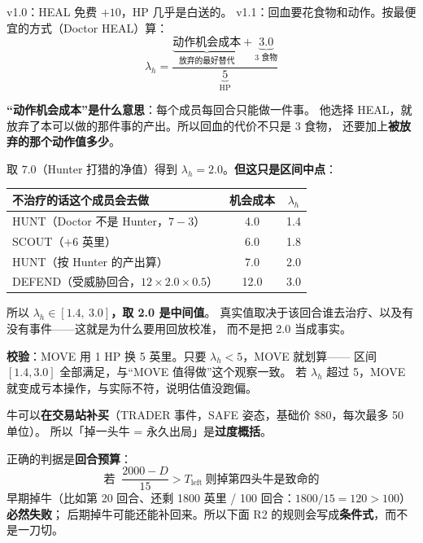 \documentclass[UTF8,11pt,a4paper]{ctexart}
\begin{document}
\begin{warnbox}[title={$\lambda_h$ 为什么是 2.0（v1.0 文档这里是 0.8）}]
v1.0：HEAL 免费 $+10$，HP 几乎是白送的。
v1.1：回血要花食物和动作。按最便宜的方式（Doctor HEAL）算：
\[
\lambda_h=\frac{\underbrace{\text{动作机会成本}}_{\text{放弃的最好替代}}+\underbrace{3.0}_{\text{3 食物}}}{\underbrace{5}_{\text{HP}}}
\]

\noindent\textbf{“动作机会成本”是什么意思}：每个成员每回合只能做一件事。
他选择 HEAL，就放弃了本可以做的那件事的产出。所以回血的代价不只是 3 食物，
还要加上\textbf{被放弃的那个动作值多少}。

\smallskip
\noindent 取 $7.0$（Hunter 打猎的净值）得到 $\lambda_h=2.0$。\textbf{但这只是区间中点}：

\begin{center}
\small
\begin{tabular}{@{}p{6.4cm}cc@{}}
\toprule
\textbf{不治疗的话这个成员会去做} & \textbf{机会成本} & $\lambda_h$ \\
\midrule
HUNT（Doctor 不是 Hunter，$7-3$） & 4.0 & 1.4 \\
SCOUT（$+6$ 英里） & 6.0 & 1.8 \\
HUNT（按 Hunter 的产出算） & 7.0 & 2.0 \\
DEFEND（受威胁回合，$12\times2.0\times0.5$） & 12.0 & 3.0 \\
\bottomrule
\end{tabular}
\end{center}

\noindent 所以 \textbf{$\lambda_h\in[1.4,\ 3.0]$，取 2.0 是中间值}。
真实值取决于该回合谁去治疗、以及有没有事件——这就是为什么要用回放校准，
而不是把 2.0 当成事实。

\smallskip
\noindent\textbf{校验}：MOVE 用 1 HP 换 5 英里。只要 $\lambda_h<5$，MOVE 就划算——
区间 $[1.4,3.0]$ 全部满足，与“MOVE 值得做”这个观察一致。
若 $\lambda_h$ 超过 5，MOVE 就变成亏本操作，与实际不符，说明估值没跑偏。
\end{warnbox}

\begin{warnbox}[title={$\lambda_o$ 不是永久损失——这里 v1.0 的说法要修正}]
牛可以\textbf{在交易站补买}（TRADER 事件，SAFE 姿态，基础价 \$80，每次最多 50 单位）。
所以「掉一头牛 = 永久出局」是\textbf{过度概括}。

正确的判据是\textbf{回合预算}：
\[
\text{若 }\ \frac{2000-D}{15}>T_{\text{left}}\ \text{则掉第四头牛是致命的}
\]
早期掉牛（比如第 20 回合、还剩 1800 英里 / 100 回合：$1800/15=120>100$）\textbf{必然失败}；
后期掉牛可能还能补回来。所以下面 R2 的规则会写成\textbf{条件式}，而不是一刀切。
\end{warnbox}
\end{document}
